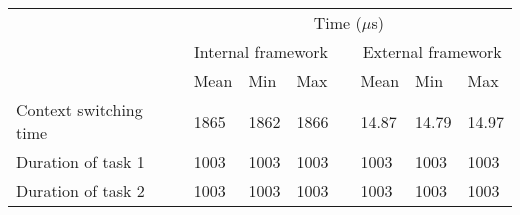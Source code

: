 \begin{tabular}{llllllll}
  & \multicolumn{7}{c}{Time ($\mu$s)}                                                      \\ \cline{2-8} 
  & \multicolumn{3}{c}{Internal framework} &  & \multicolumn{3}{c}{External framework} \\ \cline{2-4} \cline{6-8} 
  & \multicolumn{1}{c}{Mean} & Min  & Max  &  & Mean        & Min         & Max        \\ \cline{2-4} \cline{6-8} 
Context switching time & 1865                     & 1862 & 1866 &  & 14.87       & 14.79       & 14.97      \\
Duration of task 1     & 1003                     & 1003 & 1003 &  & 1003        & 1003        & 1003       \\
Duration of task 2     & 1003                     & 1003 & 1003 &  & 1003        & 1003        & 1003      
\end{tabular}